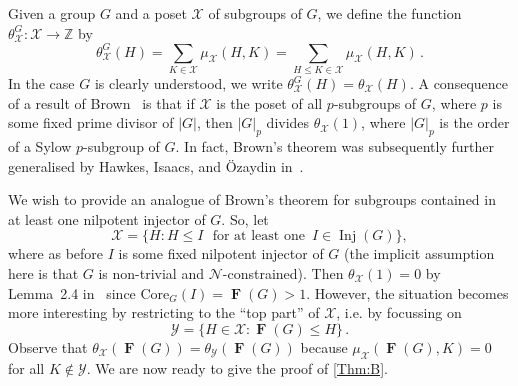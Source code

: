 \documentclass[10pt,a4paper]{amsart}
\numberwithin{equation}{section}
\DeclareMathOperator{\fitt}{\mathbf{F}}
\DeclareMathOperator{\inj}{Inj}
\newcommand{\card}[1]{\left\lvert{#1}\right\rvert}
\renewcommand{\leq}{\leqslant}
\begin{document}
Given a group $G$ and a poset $\mathcal{X}$ of subgroups of $G$,
we define the function $\theta_{\mathcal{X}}^G : \mathcal{X} \rightarrow \mathbb{Z}$ by
\[
\theta_{\mathcal{X}}^G(H) = \sum_{K \in \mathcal{X}} \mu_{\mathcal{X}}(H, K) 
                        = \sum_{H \leq K \in \mathcal{X}} \mu_{\mathcal{X}}(H, K)\,.
\]
In the case $G$ is clearly understood, we write $\theta_{\mathcal{X}}^G(H) = \theta_{\mathcal{X}}(H) $. 
A consequence of a result of Brown~\cite{pfractional} is that 
if $\mathcal{X}$ is the poset of all $p$-subgroups of $G$,
where $p$ is some fixed prime divisor of $\card{G}$,
then $\card{G}_p$ divides $\theta_{\mathcal{X}}(1)$,
where $\card{G}_p$ is the order of a Sylow $p$-subgroup of $G$.
In fact, Brown's theorem was subsequently further generalised by Hawkes, Isaacs, and \"Ozaydin in~\cite[Thm.~5.1]{mobius}.

We wish to provide an analogue of Brown's theorem 
for subgroups contained in at least one nilpotent injector of $G$.
So, let 
\[
\mathcal{X} = \{H: H \leq I\,\, \mbox{ for at least one }\, I \in \inj(G)\},
\]
where as before $I$ is some fixed nilpotent injector of $G$
(the implicit assumption here is that $G$ is non-trivial and $\mathcal{N}$-constrained).
Then $\theta_{\mathcal{X}}(1) = 0$ by Lemma~2.4 in~\cite{mobius} 
since $\mathrm{Core}_G(I) = \fitt(G) > 1$.
However, the situation becomes more interesting 
by restricting to the \enquote{top part} of $\mathcal{X}$, 
i.e. by focussing on
\[
\mathcal{Y}= \{H \in \mathcal{X} : \fitt(G) \leq H\}\,. 
\]
Observe that $\theta_{\mathcal{X}}(\fitt(G))= \theta_{\mathcal{Y}}(\fitt(G))$ because 
$\mu_{\mathcal{X}}(\fitt(G), K) = 0 $ for all $K \notin \mathcal{Y}$. 
We are now ready to give the proof of  \autoref{Thm:B}. 
\end{document}
